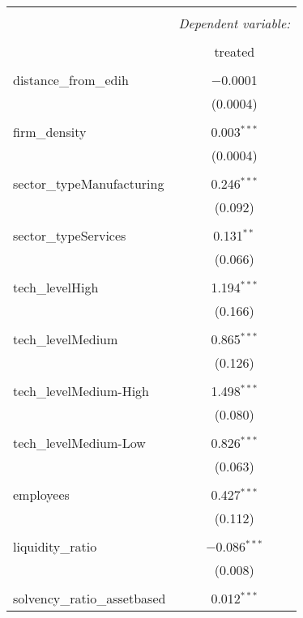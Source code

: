 
\begin{table}[!htbp] \centering 
  \caption{} 
  \label{} 
\begin{tabular}{@{\extracolsep{5pt}}lc} 
\\[-1.8ex]\hline 
\hline \\[-1.8ex] 
 & \multicolumn{1}{c}{\textit{Dependent variable:}} \\ 
\cline{2-2} 
\\[-1.8ex] & treated \\ 
\hline \\[-1.8ex] 
 distance\_from\_edih & $-$0.0001 \\ 
  & (0.0004) \\ 
  & \\ 
 firm\_density & 0.003$^{***}$ \\ 
  & (0.0004) \\ 
  & \\ 
 sector\_typeManufacturing & 0.246$^{***}$ \\ 
  & (0.092) \\ 
  & \\ 
 sector\_typeServices & 0.131$^{**}$ \\ 
  & (0.066) \\ 
  & \\ 
 tech\_levelHigh & 1.194$^{***}$ \\ 
  & (0.166) \\ 
  & \\ 
 tech\_levelMedium & 0.865$^{***}$ \\ 
  & (0.126) \\ 
  & \\ 
 tech\_levelMedium-High & 1.498$^{***}$ \\ 
  & (0.080) \\ 
  & \\ 
 tech\_levelMedium-Low & 0.826$^{***}$ \\ 
  & (0.063) \\ 
  & \\ 
 employees & 0.427$^{***}$ \\ 
  & (0.112) \\ 
  & \\ 
 liquidity\_ratio & $-$0.086$^{***}$ \\ 
  & (0.008) \\ 
  & \\ 
 solvency\_ratio\_assetbased & 0.012$^{***}$ \\ 

\end{tabular}
\end{table}
